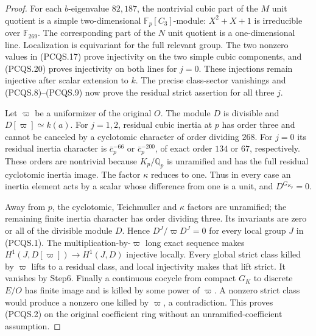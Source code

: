 \begin{proof}
For each $b$-eigenvalue $82,187$, the nontrivial cubic part of
the $M$ unit quotient is a simple two-dimensional
$\mathbb F_p[C_3]$-module: $X^2+X+1$ is irreducible over
$\mathbb F_{269}$.
The corresponding part of the $N$ unit quotient is a
one-dimensional line.
Localization is equivariant for the full relevant group.
The two nonzero values in (PCQS.17) prove injectivity on the
two simple cubic components, and (PCQS.20) proves injectivity
on both lines for $j=0$.
These injections remain injective after scalar extension to $k$.
The precise class-sector vanishings and (PCQS.8)--(PCQS.9)
now prove the residual strict assertion for all three $j$.

Let $\varpi$ be a uniformizer of the original $O$.
The module $D$ is divisible and $D[\varpi]\simeq k(a)$.
For $j=1,2$, residual cubic inertia at $p$ has order three
and cannot be canceled by a cyclotomic character of order
dividing $268$.
For $j=0$ its residual inertia character is
$\bar c_p^{-66}$ or $\bar c_p^{-200}$, of exact order
$134$ or $67$, respectively.
These orders are nontrivial because $K_p/\mathbb Q_p$ is
unramified and has the full residual cyclotomic inertia image.
The factor $\kappa$ reduces to one.
Thus in every case an inertia element acts by a scalar whose
difference from one is a unit, and $D^{G_{K_p}}=0$.

Away from $p$, the cyclotomic, Teichmuller and $\kappa$ factors
are unramified; the remaining finite inertia character has order
dividing three.  Its invariants are zero or all of the divisible
module $D$.  Hence $D^J/\varpi D^J=0$ for every local group
$J$ in (PCQS.1).
The multiplication-by-$\varpi$ long exact sequence makes
$H^1(J,D[\varpi])\to H^1(J,D)$ injective locally.
Every global strict class killed by $\varpi$ lifts to a residual
class, and local injectivity makes that lift strict.
It vanishes by Step6.
Finally a continuous cocycle from compact $G_K$ to discrete
$E/O$ has finite image and is killed by some power of $\varpi$.
A nonzero strict class would produce a nonzero one killed by
$\varpi$, a contradiction.  This proves (PCQS.2) on the original
coefficient ring without an unramified-coefficient assumption.
\end{proof}


